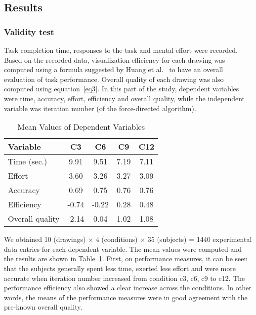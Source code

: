 \documentclass[conference,letterpaper]{IEEEtran}
\begin{document}
\subsection{Results}

\subsubsection{Validity test}

Task completion time, responses to the task and mental effort were recorded. Based on the recorded data, visualization efficiency for each drawing was computed using a formula suggested by Huang et al.~\cite{huang09} to have an overall evaluation of task performance. Overall quality of each drawing was also computed using equation~\ref{eq3}. In this part of the study, dependent variables were time, accuracy, effort, efficiency and overall quality, while the independent variable was iteration number (of the force-directed algorithm).




\begin{table}[!t]
\renewcommand{\arraystretch}{1.3}

\caption{Mean Values of Dependent Variables}
\label{tbl:average}
\centering
\begin{tabular}{l|c|c|c|c}

\hline
Variable & C3  & C6 & C9 & C12\\
\hline
\hline
 Time (sec.) &  9.91   & 9.51   & 7.19   & 7.11 \\
 Effort      & 3.60    & 3.26   & 3.27   & 3.09 \\
 Accuracy    & 0.69    & 0.75   & 0.76   & 0.76 \\
 Efficiency  & -0.74   &-0.22   & 0.28   & 0.48 \\
\hline
 Overall quality  & -2.14   &0.04   & 1.02   & 1.08 \\
\hline
\end{tabular}
\end{table}

We obtained 10 (drawings) $\times$ 4 (conditions) $\times$ 35 (subjects) = 1440 experimental data entries for each dependent variable. The mean values were computed  and the results are shown in Table~\ref{tbl:average}. First, on performance measures, it can be seen that the subjects generally spent less time, exerted less effort and were more accurate when iteration number increased from condition c3, c6, c9 to c12. The performance efficiency also showed a clear increase across the conditions. In other words, the means of the performance measures were in good agreement with the pre-known overall quality.
\end{document}
